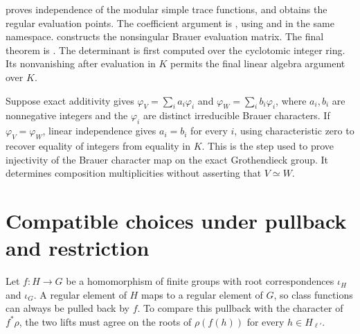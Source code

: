\begin{implementation}
 proves independence of
the modular simple trace functions, and
 obtains the regular
evaluation points. The coefficient argument is
,
using  and
 in the same namespace.
constructs the nonsingular Brauer evaluation matrix.
The final theorem is
.
The determinant is first computed over the cyclotomic integer ring.
Its nonvanishing after evaluation in $K$ permits the final linear
algebra argument over $K$.
\end{implementation}

\begin{example}
Suppose exact additivity gives
$\varphi_V=\sum_i a_i\varphi_i$ and
$\varphi_W=\sum_i b_i\varphi_i$, where $a_i,b_i$ are nonnegative integers
and the $\varphi_i$ are distinct irreducible Brauer characters.
If $\varphi_V=\varphi_W$, linear independence gives
$a_i=b_i$ for every $i$, using characteristic zero to recover equality
of integers from equality in $K$. This is the step used to prove
injectivity of the Brauer character map on the exact Grothendieck group.
It determines composition multiplicities without asserting that
$V\simeq W$.
\end{example}

\section{Compatible choices under pullback and restriction}
\label{lib:brauer:compatible-roots}

Let $f:H\to G$ be a homomorphism of finite groups with root
correspondences $\iota_H$ and $\iota_G$. A regular element of $H$ maps
to a regular element of $G$, so class functions can always be pulled back
by $f$. To compare this pullback with the character of $f^*\rho$, the
two lifts must agree on the roots of $\rho(f(h))$ for every
$h\in H_{\ell'}$.

